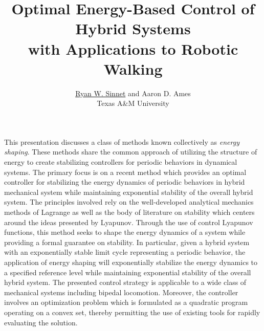 \documentclass[english]{article}
\begin{document}

\title{Optimal Energy-Based Control of Hybrid Systems\\ with Applications to
  Robotic Walking}

\author{\underline{Ryan W. Sinnet} and Aaron D. Ames \\
  Texas A\&M University}%


\date{}
\maketitle
\thispagestyle{empty}

This presentation discusses a class of methods known collectively as {\em energy
  shaping}.
%
These methods share the common approach of utilizing the structure of energy to
create stabilizing controllers for periodic behaviors in dynamical systems.
%
The primary focus is on a recent method which provides an optimal controller for
stabilizing the energy dynamics of periodic behaviors in hybrid mechanical
system while maintaining exponential stability of the overall hybrid system.
%
The principles involved rely on the well-developed analytical mechanics methods
of Lagrange as well as the body of literature on stability which centers around
the ideas presented by Lyapunov.
% 
Through the use of control Lyapunov functions, this method seeks to shape
the energy dynamics of a system while providing a formal guarantee on stability.
% 
In particular, given a hybrid system with an exponentially stable limit
cycle representing a periodic behavior, the application of energy shaping
will exponentially stabilize the energy dynamics to a specified reference
level while maintaining exponential stability of the overall hybrid system.
% 
The presented control strategy is applicable to a wide class of mechanical
systems including bipedal locomotion.
% 
Moreover, the controller involves an optimization problem which is formulated as
a quadratic program operating on a convex set, thereby permitting the use of
existing tools for rapidly evaluating the solution.
% 
\end{document}
